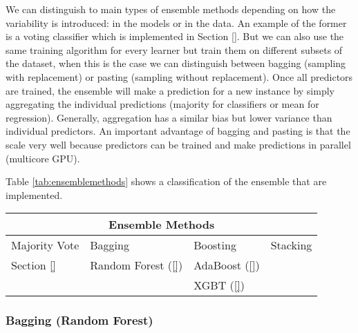 \documentclass[11pt]{article}
\theoremstyle{definition}
\theoremstyle{remark}
\begin{document}
{We can distinguish to main types of ensemble methods depending on how the variability is introduced: in the models or in the data. An example of the former is a voting  classifier which is implemented in Section \ref{}. But we can also use the same training algorithm for every learner but train them on different subsets of the dataset, when this is the case we can distinguish between bagging (sampling with replacement) or pasting (sampling without replacement). Once all predictors are trained, the ensemble will make a prediction for a new instance by simply aggregating the individual predictions (majority for classifiers or mean for regression). Generally, aggregation has a similar bias but lower variance than individual predictors. An important advantage of bagging and pasting is that the scale very well because predictors can be trained and make predictions in parallel (multicore GPU).

Table \ref{tab:ensemblemethods} shows a classification of the ensemble that are implemented.

 \label{tab:ensemblemethods} 
\begin{tabular}{ |p{3cm}||p{3cm}|p{3cm}|p{2cm}| } %
 \hline
 \multicolumn{4}{|c|}{Ensemble Methods} \\
 \hline
 Majority Vote& Bagging &Boosting&Stacking\\
 \hline
 Section \ref{}   & Random Forest (\ref{})  &AdaBoost (\ref{}) &   \\
  				  &                & XGBT (\ref{})&  \\

 \hline

\end{tabular}

\subsubsection{Bagging (Random Forest)}
\label{sse:rf}

}
\end{document}
